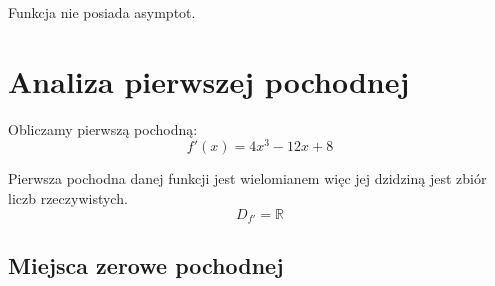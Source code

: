 \documentclass[a4paper,12pt]{article}
\begin{document}
Funkcja nie posiada asymptot.

\section{Analiza pierwszej pochodnej}
Obliczamy pierwszą pochodną:
\[ f' \left( x \right) = 4x^3 - 12x + 8 \]

Pierwsza pochodna danej funkcji jest wielomianem więc jej dzidziną jest zbiór liczb rzeczywistych.
\[ D_{f'} = \mathbb{R} \]

\subsection{Miejsca zerowe pochodnej}
\end{document}
